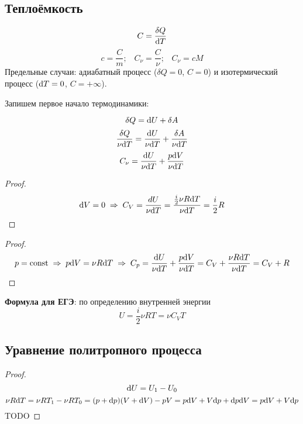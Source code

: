 \subsection{Теплоёмкость}
\[C=\frac{\delta Q}{\text{d} T}\]
\[c = \frac{C}{m} \text{;} \quad
C_\nu = \frac{C}{\nu} \text{;} \quad
C_\nu = cM\]
Предельные случаи: адиабатный процесс ($\delta Q = 0$, $C = 0$) и изотермический процесс ($\text{d} T = 0$, $C = +\infty$).\par


Запишем первое начало термодинамики:\par
\[\delta Q = \text{d} U + \delta A\]
\[\frac{\delta Q}{\nu \text{d} T} = \frac{\text{d} U}{\nu \text{d} T} + \frac{\delta A}{\nu \text{d} T}\]
\[C_\nu=\frac{\text{d} U}{\nu \text{d} T} + \frac{p \text{d} V}{\nu \text{d} T}\]

\begin{proof}
	\[\text{d} V = 0 \;\Rightarrow\; C_V = \frac{dU}{\nu \text{d} T} = \frac{\frac{i}{2}\nu R \text{d} T}{\nu \text{d} T} = \frac{i}{2}R \]
\end{proof}

\begin{proof}
	\[p =\text{const} \;\Rightarrow\; p\text{d} V = \nu R \text{d} T \;\Rightarrow\; C_p = \frac{\text{d} U}{\nu \text{d} T} + \frac{p \text{d} V}{\nu \text{d} T} = C_V + \frac{\nu R \text{d} T}{\nu \text{d} T} = C_V + R\]
\end{proof}

\textbf{Формула для ЕГЭ}: по определению внутренней энергии
\[U = \frac{i}{2} \nu R T = \nu C_V T\]



\subsection{Уравнение политропного процесса}
\begin{proof}
	\[ \text{d} U = U_1 - U_0 \]
	\[ \nu R \text{d} T = \nu R T_1 - \nu R T_0 = (p + \text{d} p)(V + \text{d} V) - pV = p \text{d} V + V \text{d} p + \text{d} p \text{d} V = p \text{d} V + V \text{d} p\]
	TODO\par
\end{proof}

